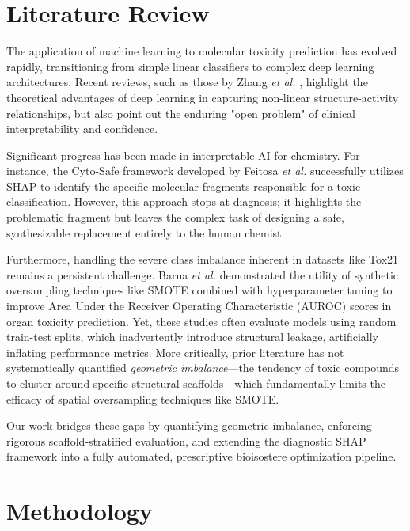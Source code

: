 \documentclass[lettersize,journal]{IEEEtran}
\begin{document}
\section{Literature Review}
The application of machine learning to molecular toxicity prediction has evolved rapidly, transitioning from simple linear classifiers to complex deep learning architectures. Recent reviews, such as those by Zhang \textit{et al.} \cite{ref6}, highlight the theoretical advantages of deep learning in capturing non-linear structure-activity relationships, but also point out the enduring "open problem" of clinical interpretability and confidence. 

Significant progress has been made in interpretable AI for chemistry. For instance, the Cyto-Safe framework developed by Feitosa \textit{et al.} \cite{ref2} successfully utilizes SHAP to identify the specific molecular fragments responsible for a toxic classification. However, this approach stops at diagnosis; it highlights the problematic fragment but leaves the complex task of designing a safe, synthesizable replacement entirely to the human chemist. 

Furthermore, handling the severe class imbalance inherent in datasets like Tox21 remains a persistent challenge. Barua \textit{et al.} \cite{ref1} demonstrated the utility of synthetic oversampling techniques like SMOTE combined with hyperparameter tuning to improve Area Under the Receiver Operating Characteristic (AUROC) scores in organ toxicity prediction. Yet, these studies often evaluate models using random train-test splits, which inadvertently introduce structural leakage, artificially inflating performance metrics. More critically, prior literature has not systematically quantified \textit{geometric imbalance}—the tendency of toxic compounds to cluster around specific structural scaffolds—which fundamentally limits the efficacy of spatial oversampling techniques like SMOTE.

Our work bridges these gaps by quantifying geometric imbalance, enforcing rigorous scaffold-stratified evaluation, and extending the diagnostic SHAP framework into a fully automated, prescriptive bioisostere optimization pipeline.

\section{Methodology}
\end{document}
